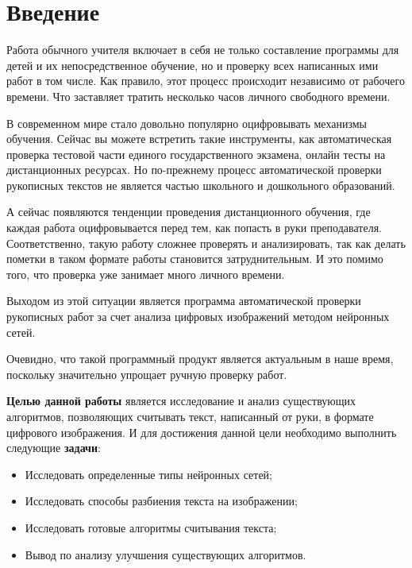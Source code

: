 \chapter*{Введение} %

Работа обычного учителя включает в себя не только составление программы для детей и их непосредственное обучение, но и проверку всех написанных ими работ в том числе. Как правило, этот процесс происходит независимо от рабочего времени. Что заставляет тратить несколько часов личного свободного времени.

В современном мире стало довольно популярно оцифровывать механизмы обучения. Сейчас вы можете встретить такие инструменты, как автоматическая проверка тестовой части единого государственного экзамена, онлайн тесты на дистанционных ресурсах. Но по-прежнему процесс автоматической проверки рукописных текстов не является частью школьного и дошкольного образований.

А сейчас появляются тенденции проведения дистанционного обучения, где каждая работа оцифровывается перед тем, как попасть в руки преподавателя. Соответственно, такую работу сложнее проверять и анализировать, так как делать пометки в таком формате работы становится затруднительным. И это помимо того, что проверка уже занимает много личного времени.

Выходом из этой ситуации является программа автоматической проверки рукописных работ за счет анализа цифровых изображений методом нейронных сетей.

Очевидно, что такой программный продукт является актуальным в наше время, поскольку значительно упрощает ручную проверку работ.

\textbf{Целью данной работы} является исследование и анализ существующих алгоритмов, позволяющих считывать текст, написанный от руки, в формате цифрового изображения. И для достижения данной цели необходимо выполнить следующие \textbf{задачи}:
\begin{itemize}
	\item Исследовать определенные типы нейронных сетей;
	\item Исследовать способы разбиения текста на изображении;
	\item Исследовать готовые алгоритмы считывания текста;
	\item Вывод по анализу улучшения существующих алгоритмов.
\end{itemize}






